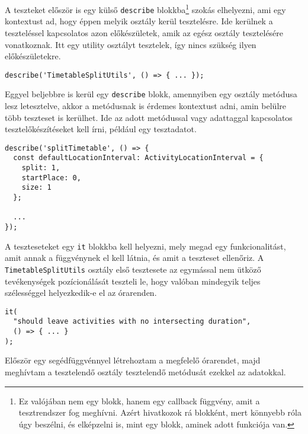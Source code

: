 \documentclass[a4paper,12pt]{report}
\begin{document}
A teszteket először is egy külső \verb|describe| blokkba\footnote{Ez valójában nem egy blokk, hanem egy callback függvény, amit a tesztrendszer fog meghívni. Azért hivatkozok rá blokként, mert könnyebb róla úgy beszélni, és elképzelni is, mint egy blokk, aminek adott funkciója van.} szokás elhelyezni, ami egy kontextust ad, hogy éppen melyik osztály kerül tesztelésre. Ide kerülnek a teszteléssel kapcsolatos azon előkészületek, amik az egész osztály tesztelésére vonatkoznak. Itt egy utility osztályt tesztelek, így nincs szükség ilyen előkészületekre.

\pagebreak
\begin{samepage}
    \begin{verbatim}
describe('TimetableSplitUtils', () => { ... });
    \end{verbatim}
\end{samepage}

Eggyel beljebbre is kerül egy \verb|describe| blokk, amennyiben egy osztály metódusa lesz letesztelve, akkor a metódusnak is érdemes kontextust adni, amin belülre több teszteset is kerülhet. Ide az adott metódussal vagy adattaggal kapcsolatos tesztelőkészítéseket kell írni, például egy tesztadatot.

\begin{samepage}
    \begin{verbatim}
describe('splitTimetable', () => {
  const defaultLocationInterval: ActivityLocationInterval = {
    split: 1,
    startPlace: 0,
    size: 1
  };

  ...
});
    \end{verbatim}
\end{samepage}

A teszteseteket egy \verb|it| blokkba kell helyezni, mely megad egy funkcionalitást, amit annak a függvénynek el kell látnia, és amit a teszteset ellenőriz. A \verb|TimetableSplitUtils| osztály első tesztesete az egymással nem ütköző tevékenységek pozícionálását teszteli le, hogy valóban mindegyik teljes szélességgel helyezkedik-e el az órarenden.

\begin{samepage}
    \begin{verbatim}
it(
  "should leave activities with no intersecting duration",
  () => { ... }
);
    \end{verbatim}
\end{samepage}

Először egy segédfüggvénnyel létrehoztam a megfelelő órarendet, majd meghívtam a tesztelendő osztály tesztelendő metódusát ezekkel az adatokkal.
\end{document}
